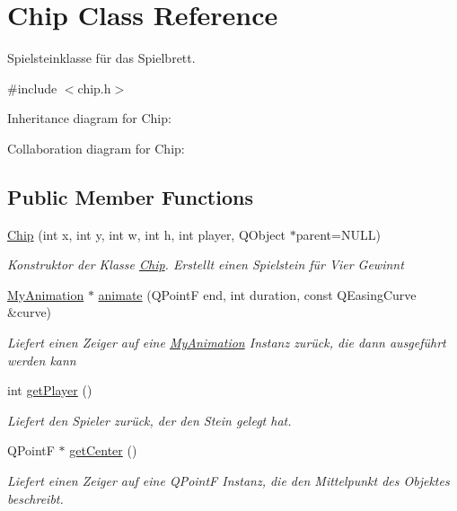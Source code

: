 \hypertarget{class_chip}{\section{Chip Class Reference}
\label{class_chip}
}


Spielsteinklasse für das Spielbrett.  




{\ttfamily \#include $<$chip.\-h$>$}



Inheritance diagram for Chip\-:


Collaboration diagram for Chip\-:
\subsection*{Public Member Functions}
\begin{DoxyCompactItemize}
\item 
\hyperlink{class_chip_a50f4a36e13f90a93d0a7ed1360bfe92a}{Chip} (int x, int y, int w, int h, int player, Q\-Object $\ast$parent=N\-U\-L\-L)
\begin{DoxyCompactList}\small\item\em Konstruktor der Klasse \hyperlink{class_chip}{Chip}. Erstellt einen Spielstein für Vier Gewinnt \end{DoxyCompactList}\item 
\hyperlink{class_my_animation}{My\-Animation} $\ast$ \hyperlink{class_chip_abb087aff174edd3145895b24f735eb29}{animate} (Q\-Point\-F end, int duration, const Q\-Easing\-Curve \&curve)
\begin{DoxyCompactList}\small\item\em Liefert einen Zeiger auf eine \hyperlink{class_my_animation}{My\-Animation} Instanz zurück, die dann ausgeführt werden kann \end{DoxyCompactList}\item 
int \hyperlink{class_chip_acbf29a18e6349c52878dca3600461af5}{get\-Player} ()
\begin{DoxyCompactList}\small\item\em Liefert den Spieler zurück, der den Stein gelegt hat. \end{DoxyCompactList}\item 
Q\-Point\-F $\ast$ \hyperlink{class_chip_a558787f04d66e87353cf8bebefae1f2d}{get\-Center} ()
\begin{DoxyCompactList}\small\item\em Liefert einen Zeiger auf eine Q\-Point\-F Instanz, die den Mittelpunkt des Objektes beschreibt. \end{DoxyCompactList}\end{DoxyCompactItemize}
